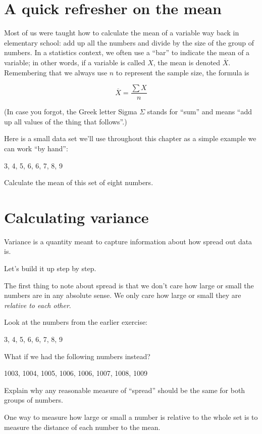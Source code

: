 \documentclass[
]{book}
\begin{document}
\hypertarget{variance-mean}{%
\section{A quick refresher on the mean}\label{variance-mean}}

Most of us were taught how to calculate the mean of a variable way back in elementary school: add up all the numbers and divide by the size of the group of numbers. In a statistics context, we often use a ``bar'' to indicate the mean of a variable; in other words, if a variable is called \(X\), the mean is denoted \(\overline{X}\). Remembering that we always use \(n\) to represent the sample size, the formula is

\[
\overline{X} = \frac{\sum{X}}{n}
\]

(In case you forgot, the Greek letter Sigma \(\Sigma\) stands for ``sum'' and means ``add up all values of the thing that follows''.)

Here is a small data set we'll use throughout this chapter as a simple example we can work ``by hand'':

3, 4, 5, 6, 6, 7, 8, 9

Calculate the mean of this set of eight numbers.

\hypertarget{variance-calculating}{%
\section{Calculating variance}\label{variance-calculating}}

Variance is a quantity meant to capture information about how spread out data is.

Let's build it up step by step.

The first thing to note about spread is that we don't care how large or small the numbers are in any absolute sense. We only care how large or small they are \emph{relative to each other}.

Look at the numbers from the earlier exercise:

3, 4, 5, 6, 6, 7, 8, 9

What if we had the following numbers instead?

1003, 1004, 1005, 1006, 1006, 1007, 1008, 1009

Explain why any reasonable measure of ``spread'' should be the same for both groups of numbers.

One way to measure how large or small a number is relative to the whole set is to measure the distance of each number to the mean.
\end{document}
